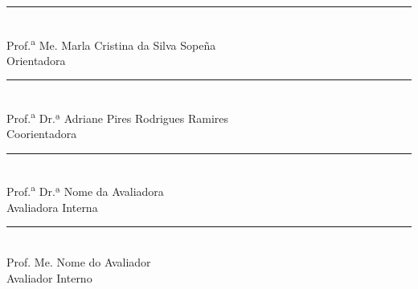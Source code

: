 \vspace{1.2cm}


\begin{center}
    \rule{8.5cm}{0.6pt}\\
    Prof.\textsuperscript{a} Me. Marla Cristina da Silva Sopeña\\
    Orientadora
    
    \vspace{0.9cm}
    
    \rule{8.5cm}{0.6pt}\\
    Prof.\textsuperscript{a} Dr.ª Adriane Pires Rodrigues Ramires\\
    Coorientadora
    
    \vspace{0.9cm}
    
    \rule{8.5cm}{0.6pt}\\
    Prof.\textsuperscript{a} Dr.ª Nome da Avaliadora\\
    Avaliadora Interna
    
    \vspace{0.9cm}
    
    \rule{8.5cm}{0.6pt}\\
    Prof. Me. Nome do Avaliador\\
    Avaliador Interno
\end{center}

\restoregeometry
\clearpage
